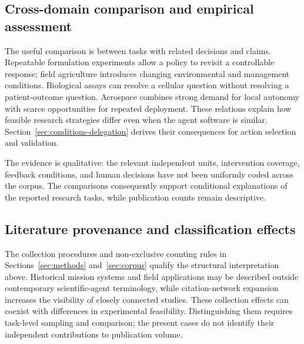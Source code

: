 \subsection{Cross-domain comparison and empirical assessment}

The useful comparison is between tasks with related decisions and claims. Repeatable formulation experiments allow a policy to revisit a controllable response; field agriculture introduces changing environmental and management conditions. Biological assays can resolve a cellular question without resolving a patient-outcome question. Aerospace combines strong demand for local autonomy with scarce opportunities for repeated deployment. These relations explain how feasible research strategies differ even when the agent software is similar. Section~\ref{sec:conditions-delegation} derives their consequences for action selection and validation.

The evidence is qualitative: the relevant independent units, intervention coverage, feedback conditions, and human decisions have not been uniformly coded across the corpus. The comparisons consequently support conditional explanations of the reported research tasks, while publication counts remain descriptive.

\subsection{Literature provenance and classification effects}

The collection procedures and non-exclusive counting rules in Sections~\ref{sec:methods} and~\ref{sec:corpus} qualify the structural interpretation above. Historical mission systems and field applications may be described outside contemporary scientific-agent terminology, while citation-network expansion increases the visibility of closely connected studies. These collection effects can coexist with differences in experimental feasibility. Distinguishing them requires task-level sampling and comparison; the present cases do not identify their independent contributions to publication volume.
